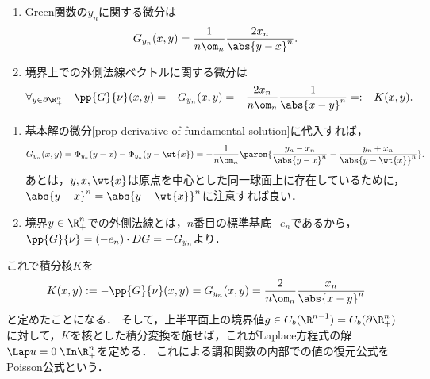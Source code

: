 \documentclass[uplatex,dvipdfmx]{jsreport}
\begin{document}
\begin{lemma}[Green関数の境界上での外側法線ベクトルに関する微分]\mbox{}
    \begin{enumerate}
        \item Green関数の$y_n$に関する微分は
        \[G_{y_n}(x,y)=\frac{1}{n\om_n}\frac{2x_n}{\abs{y-x}^n}.\]
        \item 境界上での外側法線ベクトルに関する微分は
        \[\forall_{y\in\partial\R^n_+}\quad\pp{G}{\nu}(x,y)=-G_{y_n}(x,y)=-\frac{2x_n}{n\om_n}\frac{1}{\abs{x-y}^n}=:-K(x,y).\]
    \end{enumerate}
\end{lemma}
\begin{Proof}\mbox{}
    \begin{enumerate}
        \item 基本解の微分\ref{prop-derivative-of-fundamental-solution}に代入すれば，
        \[G_{y_n}(x,y)=\Phi_{y_n}(y-x)-\Phi_{y_n}(y-\wt{x})=-\frac{1}{n\om_n}\paren{\frac{y_n-x_n}{\abs{y-x}^n}-\frac{y_n+x_n}{\abs{y-\wt{x}}^n}}.\]
        あとは，$y,x,\wt{x}$は原点を中心とした同一球面上に存在しているために，$\abs{y-x}^n=\abs{y-\wt{x}}^n$に注意すれば良い．
        \item 境界$y\in\R^n_+$での外側法線とは，$n$番目の標準基底$-e_n$であるから，$\pp{G}{\nu}=(-e_n)\cdot DG=-G_{y_n}$より．
    \end{enumerate}
\end{Proof}

\begin{definition}[上半平面に対するPoisson核が与えるPoissonの公式]
    これで積分核$K$を
    \[K(x,y):=-\pp{G}{\nu}(x,y)=G_{y_n}(x,y)=\frac{2}{n\om_n}\frac{x_n}{\abs{x-y}^n}\]
    と定めたことになる．
    そして，上半平面上の境界値$g\in C_b(\R^{n-1})=C_b(\partial\R^n_+)$に対して，$K$を核とした積分変換を施せば，これがLaplace方程式の解$\Lap u=0\;\In\R^n_+$を定める．
    これによる調和関数の内部での値の復元公式をPoisson公式という．
\end{definition}
\end{document}
